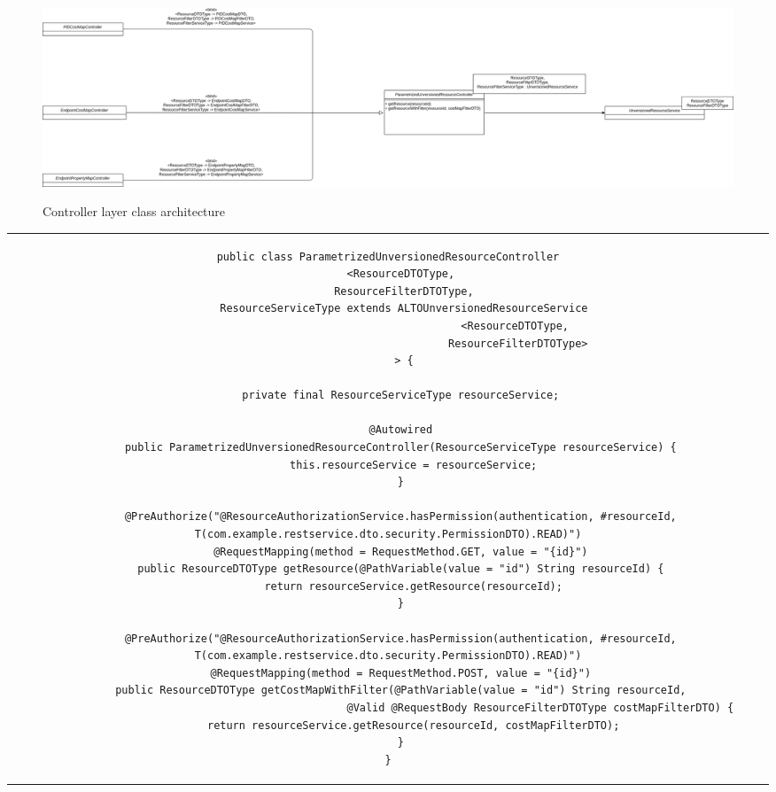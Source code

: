 \begin{figure}[H]
\centering
\hspace*{-3em}
\includegraphics[scale=0.23]{img/controller-unversioned-architecture.png}
\label{fig:controller-unversioned-architecture}
\caption{Controller layer class architecture}
\end{figure}

\begin{center}
\begin{tabular}{c}
\begin{lstlisting}[frame=tlrb, caption=Parametrized Controller class for unversioned resources, label={lst:generic-unversioned-controller}, basicstyle=\tiny]
public class ParametrizedUnversionedResourceController
    <ResourceDTOType,
     ResourceFilterDTOType,
     ResourceServiceType extends ALTOUnversionedResourceService
                                        <ResourceDTOType,
                                         ResourceFilterDTOType>
     > {

    private final ResourceServiceType resourceService;

    @Autowired
    public ParametrizedUnversionedResourceController(ResourceServiceType resourceService) {
        this.resourceService = resourceService;
    }

    @PreAuthorize("@ResourceAuthorizationService.hasPermission(authentication, #resourceId, T(com.example.restservice.dto.security.PermissionDTO).READ)")
    @RequestMapping(method = RequestMethod.GET, value = "{id}")
    public ResourceDTOType getResource(@PathVariable(value = "id") String resourceId) {
        return resourceService.getResource(resourceId);
    }

    @PreAuthorize("@ResourceAuthorizationService.hasPermission(authentication, #resourceId, T(com.example.restservice.dto.security.PermissionDTO).READ)")
    @RequestMapping(method = RequestMethod.POST, value = "{id}")
    public ResourceDTOType getCostMapWithFilter(@PathVariable(value = "id") String resourceId,
                                                @Valid @RequestBody ResourceFilterDTOType costMapFilterDTO) {
        return resourceService.getResource(resourceId, costMapFilterDTO);
    }
}

\end{lstlisting}
\end{tabular}
\end{center}

